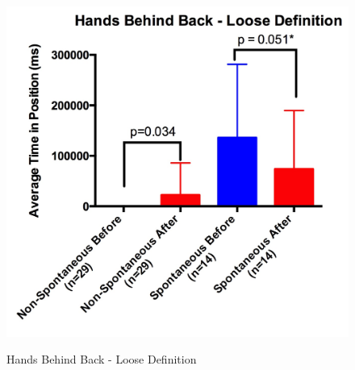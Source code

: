 \documentclass{acm_proc_article-sp}
\begin{document}
\begin{figure}[t!]
\centering
 \includegraphics[width=1.00\linewidth]{images/bloose.jpg}\\
 \caption{Hands Behind Back - Loose Definition}
 \label{bloose} %
\end{figure}


\end{document}
